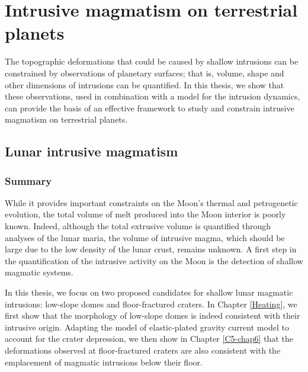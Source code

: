 \chapter{Intrusive magmatism on terrestrial planets}
\label{chap8}
\minitoc

The  topographic   deformations  that  could  be   caused  by  shallow
intrusions can  be constrained by observations  of planetary surfaces;
that  is, volume,  shape and  other  dimensions of  intrusions can  be
quantified. In this  thesis, we show that these  observations, used in
combination with a  model for the intrusion dynamics,  can provide the
basis  of an  effective  framework to  study  and constrain  intrusive
magmatism on terrestrial planets.

\section{Lunar intrusive magmatism}
\label{sec:terr-intr-magm}

\subsection{Summary}
\label{sec:summary}

While  it provides  important constraints  on the  Moon's thermal  and
petrogenetic evolution,  the total  volume of  melt produced  into the
Moon interior is  poorly known.  Indeed, although  the total extrusive
volume is quantified  through analyses of the lunar  maria, the volume
of intrusive  magma, which should be  large due to the  low density of
the lunar crust,  remains unknown. A first step  in the quantification
of the  intrusive activity  on the  Moon is  the detection  of shallow
magmatic systems.

In this thesis, we focus on  two proposed candidates for shallow lunar
magmatic intrusions:  low-slope domes and floor-fractured  craters. In
Chapter \ref{Heating}, we first show that the morphology of low-slope
domes is indeed consistent with  their intrusive origin.  Adapting the
model  of elastic-plated  gravity  current model  to  account for  the
crater depression,  we then  show in  Chapter \ref{C5-chap6}  that the
deformations observed  at floor-fractured craters are  also consistent
with the emplacement of magmatic intrusions below their floor.

